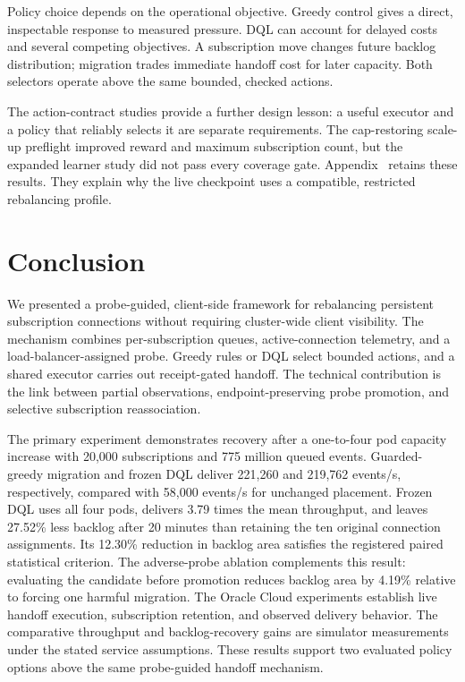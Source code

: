 Policy choice depends on the operational objective. Greedy control gives a
direct, inspectable response to measured pressure. DQL can account for delayed
costs and several competing objectives. A subscription move changes future
backlog distribution; migration trades immediate handoff cost for later
capacity. Both selectors operate above the same bounded, checked actions.

The action-contract studies provide a further design lesson: a useful
executor and a policy that reliably selects it are separate requirements.
The cap-restoring scale-up preflight improved reward and maximum subscription
count, but the expanded learner study did not pass every coverage gate.
Appendix~ retains these results. They explain why
the live checkpoint uses a compatible, restricted rebalancing profile.

\section{Conclusion}

We presented a probe-guided, client-side framework for rebalancing
persistent subscription connections without requiring cluster-wide client
visibility.  The mechanism combines per-subscription queues, active-connection
telemetry, and a load-balancer-assigned probe. Greedy rules or DQL select
bounded actions, and a shared executor carries out receipt-gated handoff.
The technical contribution is the link between partial observations,
endpoint-preserving probe promotion, and selective subscription reassociation.

The primary experiment demonstrates recovery after a one-to-four pod capacity
increase with 20,000 subscriptions and 775 million queued events. Guarded-greedy
migration and frozen DQL deliver 221,260 and 219,762 events/s, respectively,
compared with 58,000 events/s for unchanged placement. Frozen DQL
uses all four pods, delivers 3.79 times the mean throughput, and leaves 27.52\%
less backlog after 20 minutes than retaining the ten original connection
assignments. Its 12.30\% reduction in backlog area satisfies the registered
paired statistical criterion. The adverse-probe ablation complements this
result: evaluating the candidate before promotion reduces backlog area by
4.19\% relative to forcing one harmful migration.
The Oracle Cloud experiments establish live handoff execution, subscription
retention, and observed delivery behavior. The comparative throughput and
backlog-recovery gains are simulator measurements under the stated service
assumptions. These results support two evaluated policy options above the same
probe-guided handoff mechanism.
